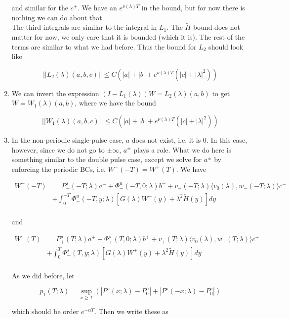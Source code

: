 \documentclass[12pt]{article}
\begin{document}
\begin{enumerate}
and similar for the $c^+$. We have an $e^{\nu(\lambda)T}$ in the bound, but for now there is nothing we can do about that.
\\

The third integrals are similar to the integral in $L_1$. The $\tilde{H}$ bound does not matter for now, we only care that it is bounded (which it is). The rest of the terms are similar to what we had before. Thus the bound for $L_2$ should look like

\[
||L_2(\lambda)(a,b,c)|| \leq C (|a| + |b| + e^{\nu(\lambda)T}(|c| + |\lambda|^2))
\]


\item We can invert the expression $(I - L_1(\lambda))W = L_2(\lambda)(a,b)$ to get $W = W_1(\lambda)(a,b)$, where we have the bound

\[
||W_1(\lambda)(a,b,c)|| \leq C (|a| + |b| + e^{\nu(\lambda)T}(|c| + |\lambda|^2))
\]

\item In the non-periodic single-pulse case, $a$ does not exist, i.e. it is 0. In this case, however, since we do not go to $\pm \infty$, $a^\pm$ plays a role. What we do here is something similar to the double pulse case, except we solve for $a^\pm$ by enforcing the periodic BCs, i.e. $W^-(-T) = W^+(T)$. We have 


\begin{align*}
W^-(-T) &= P^s_-(-T; \lambda)a^- + \Phi^u_-(-T, 0; \lambda)b^- + v_-(-T; \lambda) \langle v_0(\lambda), w_-(-T; \lambda) \rangle c^- \\
&+ \int_0^{-T} \Phi^u_-(-T, y; \lambda)[ G(\lambda)W^-(y) + \lambda^2 \tilde{H}(y) ] dy \\
\end{align*}

and

\begin{align*}
W^+(T) &= P^u_+(T; \lambda)a^+ + \Phi^s_+(T, 0; \lambda)b^+ + v_+(T; \lambda) \langle v_0(\lambda), w_+(T; \lambda) \rangle c^+ \\
&+ \int_0^T \Phi^s_+(T, y; \lambda) [ G(\lambda)W^+(y) + \lambda^2 \tilde{H}(y) ] dy \\
\end{align*}

As we did before, let

\[
p_1(T;\lambda) = \sup_{x \geq T} (|P^u(x;\lambda) - P_0^u| + |P^s(-x;\lambda) - P_0^s|)
\]

which should be order $e^{-\alpha T}$. Then we write these as


\end{enumerate}
\end{document}
